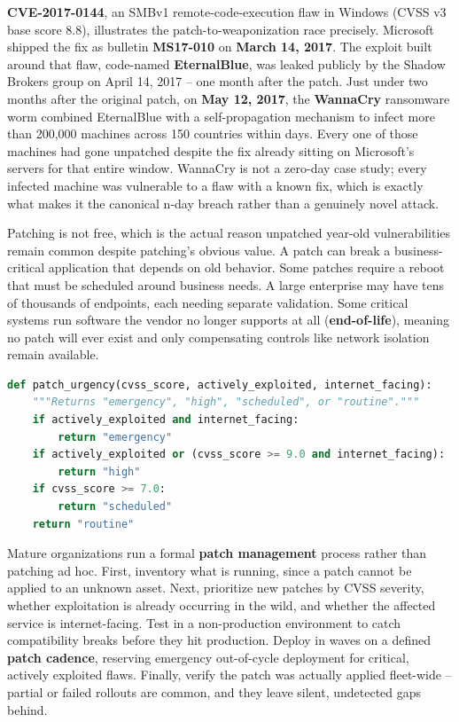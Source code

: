 \begin{example}
\textbf{CVE-2017-0144}, an SMBv1 remote-code-execution flaw in Windows (CVSS v3 base score 8.8),
illustrates the patch-to-weaponization race precisely. Microsoft shipped the fix as bulletin
\textbf{MS17-010} on \textbf{March 14, 2017}. The exploit built around that flaw,
code-named \textbf{EternalBlue}, was leaked publicly by the Shadow Brokers group on April 14,
2017 -- one month after the patch. Just under two months after the original patch, on
\textbf{May 12, 2017}, the \textbf{WannaCry} ransomware worm combined EternalBlue with a
self-propagation mechanism to infect more than 200{,}000 machines across 150
countries within days. Every one of those machines had gone unpatched despite the
fix already sitting on Microsoft's servers for that entire window. WannaCry is not a
zero-day case study; every infected machine was vulnerable to a flaw with a known fix, which is
exactly what makes it the canonical n-day breach rather than a genuinely novel attack.
\end{example}

Patching is not free, which is the actual reason unpatched year-old vulnerabilities remain common
despite patching's obvious value. A patch can break a business-critical application that depends
on old behavior. Some patches require a reboot that must be scheduled around business needs. A
large enterprise may have tens of thousands of endpoints, each needing separate validation. Some
critical systems run software the vendor no longer supports at all (\textbf{end-of-life}), meaning
no patch will ever exist and only compensating controls like network isolation remain available.

\begin{lstlisting}[language=Python, caption={Prioritizing a patch by severity, exploitation status, and exposure}]
def patch_urgency(cvss_score, actively_exploited, internet_facing):
    """Returns "emergency", "high", "scheduled", or "routine"."""
    if actively_exploited and internet_facing:
        return "emergency"
    if actively_exploited or (cvss_score >= 9.0 and internet_facing):
        return "high"
    if cvss_score >= 7.0:
        return "scheduled"
    return "routine"
\end{lstlisting}

Mature organizations run a formal \textbf{patch management} process rather than patching ad hoc.
First, inventory what is running, since a patch cannot be applied to an unknown asset. Next,
prioritize new patches by CVSS severity, whether exploitation is already occurring in the wild,
and whether the affected service is internet-facing. Test in a non-production environment to catch
compatibility breaks before they hit production. Deploy in waves on a defined \textbf{patch
cadence}, reserving emergency out-of-cycle deployment for critical, actively exploited flaws.
Finally, verify the patch was actually applied fleet-wide -- partial or failed rollouts are common,
and they leave silent, undetected gaps behind.

